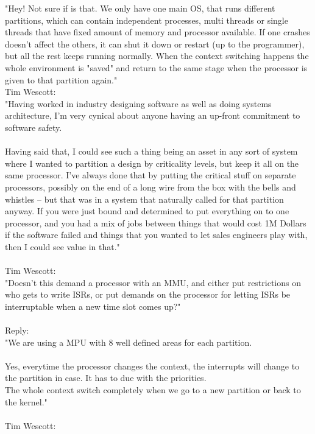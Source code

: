 "Hey! Not sure if is that. We only have one main OS, that runs different partitions, which can contain 
independent processes, multi threads or single threads that have fixed amount of memory and processor 
available. If one crashes doesn't affect the others, it can shut it down or restart (up to the 
programmer), but all the rest keeps running normally. When the context switching happens the whole 
environment is "saved" and return to the same stage when the processor is given to that partition again."
\\
Tim Wescott:\\

"Having worked in industry designing software as well as doing systems architecture, I'm very cynical 
about anyone having an up-front commitment to software safety.\\
\\
Having said that, I could see such a thing being an asset in any sort of system where I wanted to 
partition a design by criticality levels, but keep it all on the same processor.  I've always done that by 
putting the critical stuff on separate processors, possibly on the end of a long wire from the box with 
the bells and whistles -- but that was in a system that naturally called for that partition anyway.  If 
you were just bound and determined to put everything on to one processor, and you had a mix of jobs 
between things that would cost 1M Dollars if the software failed and things that you wanted to let sales 
engineers play with, then I could see value in that."\\
\\
Tim Wescott:\\

"Doesn't this demand a processor with an MMU, and either put restrictions on who gets to write ISRs, or 
put demands on the processor for letting ISRs be interruptable when a new time slot comes up?"\\
\\
Reply:\\

"We are using a MPU with 8 well defined areas for each partition.\\
\\

Yes, everytime the processor changes the context, the interrupts will change to the partition in case. It 
has to due with the priorities.\\
The whole context switch completely when we go to a new partition or back to the kernel."\\
\\
Tim Wescott:\\

